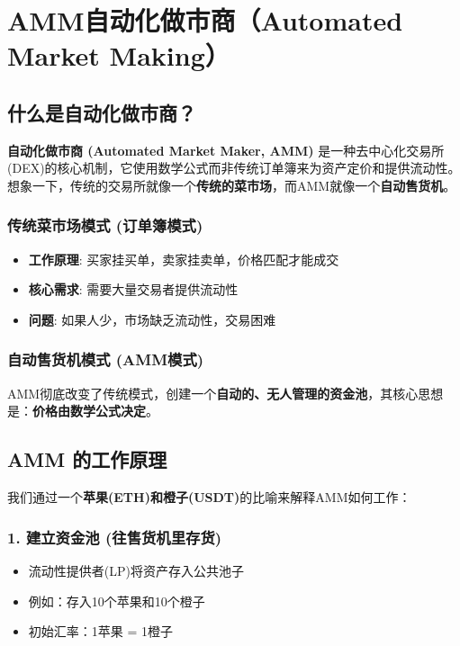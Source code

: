 \documentclass[12pt]{ctexart}
\begin{document}
\newpage

\section{AMM自动化做市商（Automated Market Making）}
\subsection{什么是自动化做市商？}

\textbf{自动化做市商 (Automated Market Maker, AMM)} 是一种去中心化交易所(DEX)的核心机制，它使用数学公式而非传统订单簿来为资产定价和提供流动性。想象一下，传统的交易所就像一个\textbf{传统的菜市场}，而AMM就像一个\textbf{自动售货机}。

\subsubsection{传统菜市场模式 (订单簿模式)}
\begin{itemize}
    \item \textbf{工作原理}: 买家挂买单，卖家挂卖单，价格匹配才能成交
    \item \textbf{核心需求}: 需要大量交易者提供流动性
    \item \textbf{问题}: 如果人少，市场缺乏流动性，交易困难
\end{itemize}

\subsubsection{自动售货机模式 (AMM模式)}
AMM彻底改变了传统模式，创建一个\textbf{自动的、无人管理的资金池}，其核心思想是：\textbf{价格由数学公式决定}。

\subsection{AMM 的工作原理}

我们通过一个\textbf{苹果(ETH)和橙子(USDT)}的比喻来解释AMM如何工作：

\subsubsection{1. 建立资金池 (往售货机里存货)}
\begin{itemize}
    \item 流动性提供者(LP)将资产存入公共池子
    \item 例如：存入10个苹果和10个橙子
    \item 初始汇率：1苹果 = 1橙子
\end{itemize}
\end{document}
